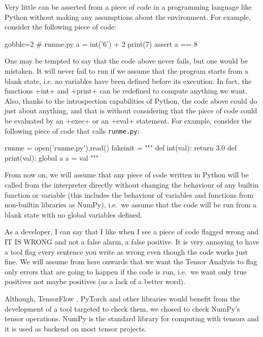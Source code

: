 Very little can be asserted from a piece of code in a programming language like Python
without making any assumptions about the environment. For example, consider the following
piece of code:

\begin{pythoncode*}{gobble=2}
  # runme.py
  a = int('6') + 2
  print(7)
  assert a == 8
\end{pythoncode*}

One may be tempted to say that the code above never fails, but one would be mistaken.  It
will never fail to run if we assume that the program starts from a blank state, i.e. no
variables have been defined before its execution. In fact, the functions \pycode+int+ and
\pycode+print+ can be redefined to compute anything we want. Also, thanks to the
introspection capabilities of Python, the code above could do just about anything, and
that is without considering that the piece of code could be evaluated by an \pycode+exec+
or an \pycode+eval+ statement. For example, consider the following piece of code that
calls \texttt{runme.py}:

\begin{pythoncode}
  runme = open('runme.py').read()
  fakeinit = """
  def int(val):
    return 3.0
  def print(val):
    global a
    a = val
  """
\end{pythoncode}

From now on, we will assume that any piece of code written in Python will be called from
the interpreter directly without changing the behaviour of any builtin function or
variable (this includes the behaviour of variables and functions from non-builtin
libraries as NumPy), i.e.~we assume that the code will be run from a blank state with no
global variables defined.

As a developer, I can say that I like when I see a piece of code flagged wrong and IT IS
WRONG and not a false alarm, a false positive. It is very annoying to have a tool flag
every sentence you write as wrong even though the code works just fine. We will assume
from here onwards that we want the Tensor Analysis to flag only errors that are going to
happen if the code is run, i.e.~we want only true positives not maybe positives (as a lack
of a better word).

Although, TensorFlow \autocite{abadi_tensorflow_2016}, PyTorch
\autocite{paszke2017pytorch} and other libraries would benefit from the development of a
tool targeted to check them, we chosed to check NumPy's tensor operations. NumPy is the
standard library for computing with tensors and it is used as backend on most tensor
projects.

